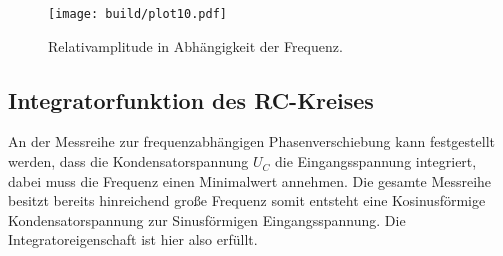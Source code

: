 \begin{figure}
    \centering 
    \texttt{[image: build/plot10.pdf]}
    \caption{Relativamplitude in Abhängigkeit der Frequenz.}
    \label{fig:pltmill}
\end{figure} 

\subsection{Integratorfunktion des RC-Kreises}
An der Messreihe zur frequenzabhängigen Phasenverschiebung kann festgestellt werden, dass die Kondensatorspannung $U_{C}$ die Eingangsspannung
integriert, dabei muss die Frequenz einen Minimalwert annehmen. Die gesamte Messreihe besitzt bereits hinreichend große Frequenz somit entsteht eine Kosinusförmige Kondensatorspannung
zur Sinusförmigen Eingangsspannung. Die Integratoreigenschaft ist hier also erfüllt.


